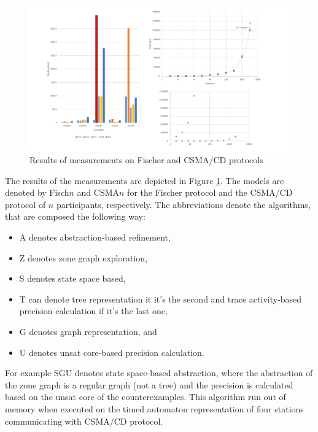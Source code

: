 \begin{figure}
	\centering
	\includegraphics[width=\textwidth]{include/figures/diag_fischcsma}
	\caption{Results of measurements on Fischer and CSMA/CD protocols}
	\label{fig:mesurements}
\end{figure}

The results of the measurements are depicted in Figure \ref{fig:mesurements}. The models are denoted by Fisch$n$ and CSMA$n$ for the Fischer protocol and the CSMA/CD protocol of $n$ participants, respectively. The abbreviations denote the algorithms, that are composed the following way:

\begin{itemize}
	\item A denotes abstraction-based refinement, 
	\item Z denotes zone graph exploration,
	\item S denotes state space based,
	\item T can denote tree representation it it's the second and trace activity-based precision calculation if it's the last one,
	\item G denotes graph representation, and
	\item U denotes unsat core-based precision calculation.
\end{itemize}

For example SGU denotes state space-based abstraction, where the abstraction of the zone graph is a regular graph (not a tree) and the precision is calculated based on the unsat core of the counterexamples. This algorithm run out of memory when executed on the timed automaton representation of four stations communicating with CSMA/CD protocol.




